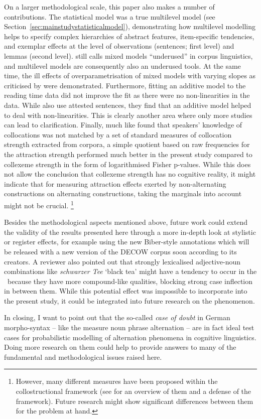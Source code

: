 On a larger methodological scale, this paper also makes a number of contributions.
The statistical model was a true multilevel model (see Section~\ref{sec:mainstudystatisticalmodel}), demonstrating how multilevel modelling helps to specify complex hierarchies of abstract features, item-specific tendencies, and exemplar effects at the level of observations (sentences; first level) and lemmas (second level).
\cite{Gries2015} still calls mixed models ``underused'' in corpus linguistics, and multilevel models are consequently also an underused tools.
At the same time, the ill effects of overparametrisation of mixed models with varying slopes as criticised by \cite{BatesEa2015a} were demonstrated.
Furthermore, fitting an additive model to the reading time data did not improve the fit as there were no non-linearities in the data.
While \cite{DivjakEa2016} also use attested sentences, they find that an additive model helped to deal with non-linearities.
This is clearly another area where only more studies can lead to clarification.
Finally, much like \cite{Dabrowska2014} found that speakers' knowledge of collocations was not matched by a set of standard measures of collocation strength extracted from corpora, a simple quotient based on raw frequencies for the attraction strength performed much better in the present study compared to collexeme strength in the form of logarithmised Fisher p-values. 
While this does not allow the conclusion that collexeme strength has no cognitive reality, it might indicate that for measuring attraction effects exerted by non-alternating constructions on alternating constructions, taking the marginals into account might not be crucial.%
\footnote{However, many different measures have been proposed within the collostructional framework (see \citealp{Gries2015b} for an overview of them and a defense of the framework).
Future research might show significant differences between them for the problem at hand.}

Besides the methodological aspects mentioned above, future work could extend the validity of the results presented here through a more in-depth look at stylistic or register effects, for example using the new Biber-style annotations \citep{Biber1988} which will be released with a new version of the DECOW corpus soon according to its creators.
A reviewer also pointed out that strongly lexicalised adjective-noun combinations like \textit{schwarzer Tee} `black tea' might have a tendency to occur in the \NACa\ because they have more compound-like qualities, blocking strong case inflection in between them.
While this potential effect was impossible to incorporate into the present study, it could be integrated into future research on the phenomenon.

In closing, I want to point out that the so-called \textit{case of doubt} in German morpho-syntax -- like the measure noun phrase alternation -- are in fact ideal test cases for probabilistic modelling of alternation phenomena in cognitive linguistics.
Doing more research on them could help to provide answers to many of the fundamental and methodological issues raised here.
